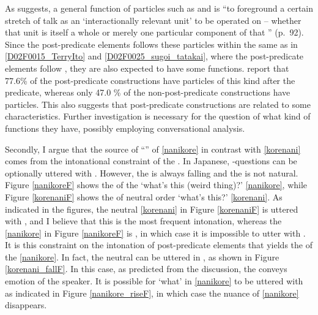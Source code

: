 As  suggests,
a general function of  particles such as  and  is ``to foreground a certain stretch of talk as an `interactionally relevant unit' to be operated on
-- whether that unit is itself a whole  or merely one particular component of that '' (p.~92).
Since the post-predicate elements follows these  particles within the same  as in \ref{D02F0015_TerryIto} and \ref{D02F0025_sugoi_tatakai},
where the post-predicate elements follow ,
they are also expected to have some  functions.
 report that
77.6\% of the post-predicate constructions have  particles of this kind after the predicate,
whereas only 47.0 \% of the non-post-predicate constructions have  particles.
This also suggests that post-predicate constructions are related to
some  characteristics.
Further investigation is necessary for the question of what kind of  functions they have,
possibly employing conversational analysis.

Secondly,
I argue that 
the source of ``''  of \ref{nanikore} in contrast with \ref{korenani} comes from the intonational constraint of the .
In Japanese, -questions can be optionally uttered with .
However, the  is always falling and the  is not natural.
Figure \ref{nanikoreF} shows the  of the   `what's this (weird thing)?' \ref{nanikore},
while Figure \ref{korenaniF} shows the  of neutral order  `what's this?' \ref{korenani}.
As indicated in the figures, the neutral  \ref{korenani} in Figure \ref{korenaniF} is uttered with ,
and I believe that this is the most frequent intonation,
whereas the  \ref{nanikore} in Figure \ref{nanikoreF} is ,
in which case it is impossible to utter  with .
It is this constraint on the intonation of post-predicate elements that yields the   of the  \ref{nanikore}.
In fact, the neutral   can be uttered in , as shown in Figure \ref{korenani_fallF}.
In this case, as predicted from the discussion, the  conveys emotion of the speaker.
It is possible for  `what' in \ref{nanikore} to be uttered with  as indicated in Figure \ref{nanikore_riseF},
in which case the  nuance of \ref{nanikore} disappears.


